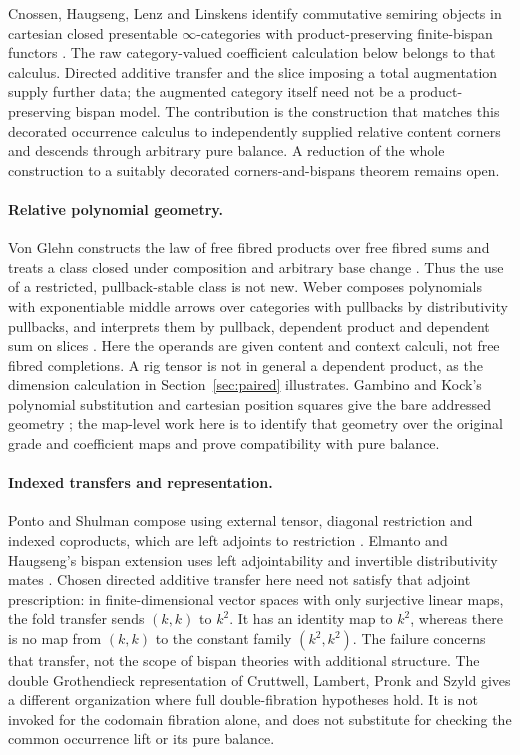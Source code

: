 \documentclass[11pt]{article}
\numberwithin{equation}{section}
\theoremstyle{definition}\newtheorem{definition}[theorem]{Definition}
\begin{document}
Cnossen, Haugseng, Lenz and Linskens identify commutative semiring objects
in cartesian closed presentable $\infty$-categories with product-preserving
finite-bispan functors \cite[Thm.~A]{CHLL}.
The raw category-valued coefficient calculation below belongs to that
calculus. Directed additive transfer and the slice imposing a total
augmentation supply further data; the augmented category itself need not
be a product-preserving bispan model. The contribution is the construction
that matches this decorated occurrence calculus to independently supplied
relative content corners and descends through arbitrary pure balance.
A reduction of the whole construction to a suitably decorated
corners-and-bispans theorem remains open.

\paragraph{Relative polynomial geometry.}
Von Glehn constructs the law of free fibred products over free fibred
sums and treats a class closed under composition and arbitrary base
change \cite[Thms.~7.1--7.2 and Sec.~8]{vonglehn}. Thus the use of a
restricted, pullback-stable class is not new. Weber composes polynomials
with exponentiable middle arrows over categories with pullbacks by
distributivity pullbacks, and interprets them by pullback, dependent
product and dependent sum on slices
\cite[Thms.~3.1.10 and 3.2.6]{weber}. Here the operands are given
content and context calculi, not free fibred completions. A rig tensor
is not in general a dependent product, as the dimension calculation
in Section~\ref{sec:paired} illustrates. Gambino and Kock's polynomial
substitution and cartesian position squares give the bare addressed
geometry \cite[Secs.~1.11, 2.1 and 4.1]{gambinokock}; the map-level
work here is to identify that geometry over the original grade and
coefficient maps and prove compatibility with pure balance.

\paragraph{Indexed transfers and representation.}
Ponto and Shulman compose using external tensor, diagonal restriction
and indexed coproducts, which are left adjoints to restriction
\cite[Def.~3.1 and Thm.~5.2]{pontos}. Elmanto and Haugseng's bispan
extension uses left adjointability and invertible distributivity mates
\cite[Def.~2.4.10, Thm.~2.5.1 and Cor.~2.5.15]{eh}. Chosen directed
additive transfer here need not satisfy that adjoint prescription:
in finite-dimensional vector spaces with only surjective linear maps,
the fold transfer sends $(k,k)$ to $k^2$. It has an identity map to
$k^2$, whereas there is no map from $(k,k)$ to the constant family
$(k^2,k^2)$. The failure concerns that transfer, not the scope of
bispan theories with additional structure. The double Grothendieck
representation of Cruttwell, Lambert, Pronk and Szyld
\cite[Def.~2.23 and Thm.~3.41]{doublefib} gives a different organization
where full double-fibration hypotheses hold. It is not invoked for
the codomain fibration alone, and does not substitute for checking
the common occurrence lift or its pure balance.
\end{document}
